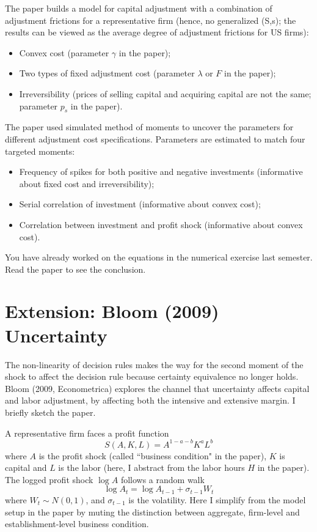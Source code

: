 \documentclass[12pt]{article}
\begin{document}
The paper builds a model for capital adjustment with a combination of adjustment frictions for a representative firm (hence, no generalized (S,s); the results can be viewed as the average degree of adjustment frictions for US firms):
\begin{itemize}
	\item Convex cost (parameter $\gamma$ in the paper);
	\item Two types of fixed adjustment cost (parameter $\lambda$ or $F$ in the paper);
	\item Irreversibility (prices of selling capital and acquiring capital are not the same; parameter $p_s$ in the paper).
\end{itemize}
The paper used simulated method of moments to uncover the parameters for different adjustment cost specifications. Parameters are estimated to match four targeted moments:
\begin{itemize}
	\item Frequency of spikes for both positive and negative investments (informative about fixed cost and irreversibility);
	\item Serial correlation of investment (informative about convex cost);
	\item Correlation between investment and profit shock (informative about convex cost). 
\end{itemize}
You have already worked on the equations in the numerical exercise last semester. Read the paper to see the conclusion.

\section{Extension: Bloom (2009) Uncertainty}

The non-linearity of decision rules makes the way for the second moment of the shock to affect the decision rule because certainty equivalence no longer holds. Bloom (2009, Econometrica) explores the channel that uncertainty affects capital and labor adjustment, by affecting both the intensive and extensive margin. I briefly sketch the paper.

A representative firm faces a profit function
\begin{equation}
	S(A, K, L) = A^{1-a-b} K^a L^b
\end{equation}
where $A$ is the profit shock (called ``business condition" in the paper), $K$ is capital and $L$ is the labor (here, I abstract from the labor hours $H$ in the paper). The logged profit shock $\log A$ follows a random walk
\begin{equation}
	\log A_t = \log A_{t-1} + \sigma_{t-1} W_t
\end{equation} 
where $W_t \sim N(0,1)$, and $\sigma_{t-1}$ is the volatility. Here I simplify from the model setup in the paper by muting the distinction between aggregate, firm-level and establishment-level business condition. 
\end{document}
